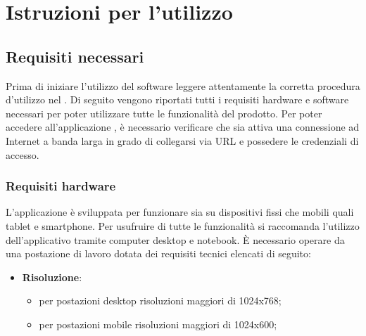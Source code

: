 %

\section{Istruzioni per l'utilizzo} %
\label{sec:istruzioni_per_l_utilizzo}


	\subsection{Requisiti necessari} %
	\label{sec:requisiti_necessari}
		Prima di iniziare l'utilizzo del software \projectName{} leggere attentamente la corretta procedura d'utilizzo nel \docNameVersionMU.\newline
		Di seguito vengono riportati tutti i requisiti hardware\gloss{} e software\gloss{} necessari per poter utilizzare tutte le funzionalità del prodotto.\newline
		Per poter accedere all'applicazione \projectName, è necessario verificare che sia attiva una connessione ad Internet a banda larga\gloss{} in grado di collegarsi via URL\gloss{} e possedere le credenziali\gloss{} di accesso.


		\subsubsection{Requisiti hardware} %
		\label{sec:requisiti_hardware}
			L'applicazione è sviluppata per funzionare sia su dispositivi fissi che mobili quali tablet e smartphone.\newline
			Per usufruire di tutte le funzionalità si raccomanda l'utilizzo dell'applicativo tramite computer desktop e notebook.\newline
			È necessario operare da una postazione di lavoro dotata dei requisiti tecnici elencati di seguito:
			\begin{itemize}
				\item \textbf{Risoluzione}:
				\begin{itemize}
					\item per postazioni desktop risoluzioni maggiori di 1024x768;
					\item per postazioni mobile risoluzioni maggiori di 1024x600;
				\end{itemize}
			\end{itemize}


